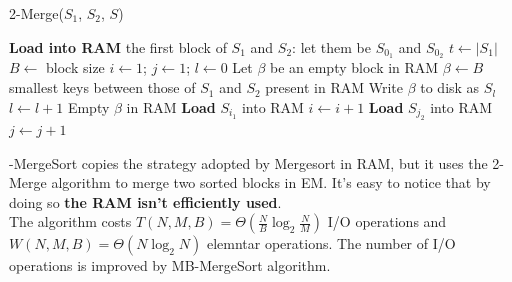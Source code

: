 \documentclass{report}
\begin{document}
\begin{algorithm}[H]
    \caption{2-Merge(\(S_1\), \(S_2\), \(S\))}
    \begin{algorithmic}[1]
    \State \textbf{Load into RAM} the first block of \(S_1\) and \(S_2\): let them be \(S_{0_1}\) and \(S_{0_2}\)
    \State \(t \gets |S_1|\)
    \State \(B \gets\) block size
    \State \(i \gets 1\); \(j \gets 1\); \(l \gets 0\)
    \State Let \(\beta\) be an empty block in RAM
        \State \(\beta \gets B\) smallest keys between those of \(S_1\) and \(S_2\) present in RAM
        \State Write \(\beta\) to disk as \(S_l\)
        \State \(l \gets l + 1\)
        \State Empty \(\beta\) in RAM
            \State \textbf{Load} \(S_{i_1}\) into RAM
            \State \(i \gets i + 1\)
        \EndIf
            \State \textbf{Load} \(S_{j_2}\) into RAM
            \State \(j \gets j + 1\)
        \EndIf
    \EndWhile
    \end{algorithmic}
\end{algorithm}
-MergeSort copies the strategy adopted by Mergesort in RAM, but it uses the 2-Merge algorithm to merge two sorted blocks in EM.
It's easy to notice that by doing so \textbf{the RAM isn't efficiently used}.
\\The algorithm costs \(T(N,M,B)=\Theta(\frac{N}{B} \log_2 \frac{N}{M})\) I/O operations and \(W(N,M,B)=\Theta(N \log_2 N)\) elemntar operations. The number of I/O operations is improved by MB-MergeSort algorithm.
\end{document}
